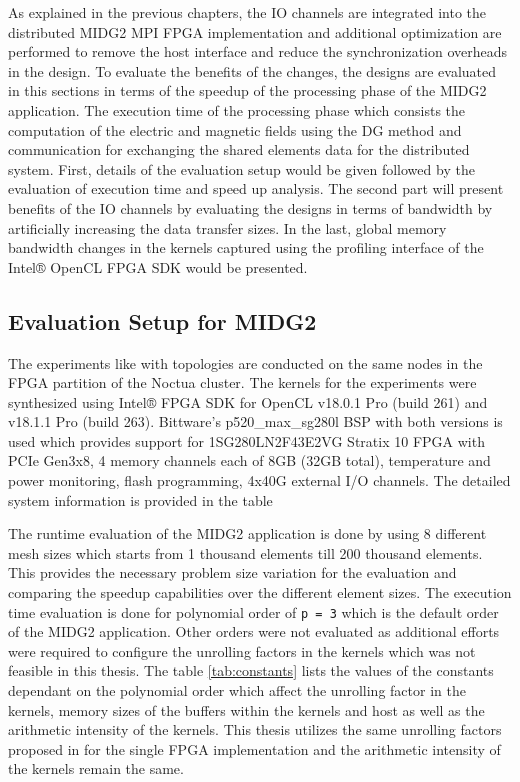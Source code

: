As explained in the previous chapters, the IO channels are integrated into the
distributed MIDG2 MPI FPGA implementation and additional optimization are performed
to remove the host interface and reduce the synchronization overheads in the design.
To evaluate the benefits of the changes, the designs are evaluated in this sections
in terms of the speedup of the processing phase of the MIDG2 application. The execution
time of the processing phase which consists the computation of the electric
and magnetic fields using the \ac{DG} method and communication for exchanging the
shared elements data for the distributed system. First, details of the
evaluation setup would be given followed by the evaluation of execution
time and speed up analysis. The second part will present benefits of the IO
channels by evaluating the designs in terms of bandwidth by artificially
increasing the data transfer sizes. In the last, global memory bandwidth
changes in the kernels captured using the profiling interface of the Intel®
OpenCL FPGA SDK would be presented.

\subsection{Evaluation Setup for MIDG2}

The experiments like with topologies are conducted on the same
nodes in the FPGA partition of the Noctua cluster. The kernels
for the experiments were synthesized using Intel® FPGA SDK for OpenCL
v18.0.1 Pro (build 261) and v18.1.1 Pro (build 263). Bittware's
p520\_max\_sg280l BSP with both versions is used which provides support
for 1SG280LN2F43E2VG Stratix 10 FPGA with PCIe Gen3x8, 4 memory channels
each of 8GB (32GB total), temperature and power monitoring,
flash programming, 4x40G external I/O channels. The detailed system
information is provided in the table 

The runtime evaluation of the MIDG2 application is done by using
8 different mesh sizes which starts from 1 thousand elements till
200 thousand elements. This provides the necessary problem size
variation for the evaluation and comparing the speedup capabilities
over the different element sizes. The execution time evaluation
is done for polynomial order of \texttt{p = 3} which is the default
order of the MIDG2 application. Other orders were not evaluated as
additional efforts were required to configure the unrolling factors
in the kernels which was not feasible in this thesis. The table
\ref{tab:constants} lists the values of the constants dependant
on the polynomial order which affect the unrolling factor in the
kernels, memory sizes of the buffers within the kernels and
host as well as the arithmetic intensity of the kernels.
This thesis utilizes the same unrolling factors proposed in
\cite{kenter_opencl-based_2018} for the single FPGA implementation
and the arithmetic intensity of the kernels remain the same.


